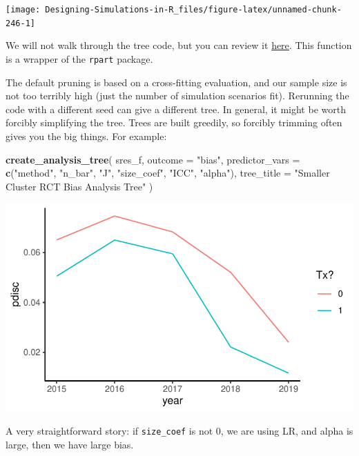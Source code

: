 \documentclass[
]{book}
\newenvironment{Shaded}{\begin{snugshade}}{\end{snugshade}}
\newcommand{\AttributeTok}[1]{\textcolor[rgb]{0.13,0.29,0.53}{#1}}
\newcommand{\FunctionTok}[1]{\textcolor[rgb]{0.13,0.29,0.53}{\textbf{#1}}}
\newcommand{\NormalTok}[1]{#1}
\newcommand{\StringTok}[1]{\textcolor[rgb]{0.31,0.60,0.02}{#1}}
\begin{document}
\begin{center}\texttt{[image: Designing-Simulations-in-R\_files/figure-latex/unnamed-chunk-246-1]} \end{center}

We will not walk through the tree code, but you can review it \href{code/create_analysis_tree.R}{here}.
This function is a wrapper of the \texttt{rpart} package.

The default pruning is based on a cross-fitting evaluation, and our sample size is not too terribly high (just the number of simulation scenarios fit).
Rerunning the code with a different seed can give a different tree.
In general, it might be worth forcibly simplifying the tree.
Trees are built greedily, so forcibly trimming often gives you the big things.
For example:

\begin{Shaded}
\begin{Highlighting}[]
\FunctionTok{create\_analysis\_tree}\NormalTok{( sres\_f,}
                      \AttributeTok{outcome =} \StringTok{"bias"}\NormalTok{,}
                      \AttributeTok{predictor\_vars =} \FunctionTok{c}\NormalTok{(}\StringTok{"method"}\NormalTok{, }\StringTok{"n\_bar"}\NormalTok{, }\StringTok{"J"}\NormalTok{,}
                                         \StringTok{"size\_coef"}\NormalTok{, }\StringTok{"ICC"}\NormalTok{, }\StringTok{"alpha"}\NormalTok{),}
                      \AttributeTok{tree\_title =} \StringTok{"Smaller Cluster RCT Bias Analysis Tree"}\NormalTok{ )}
\end{Highlighting}
\end{Shaded}

\begin{center}\includegraphics[width=0.75\linewidth]{Designing-Simulations-in-R_files/figure-latex/unnamed-chunk-247-1} \end{center}

A very straightforward story: if \texttt{size\_coef} is not 0, we are using LR, and alpha is large, then we have large bias.
\end{document}
